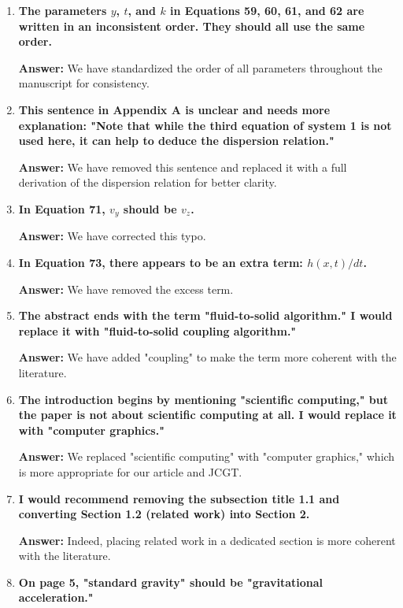 \documentclass{article}
\newcommand{\answer}[1]{\textbf{\textcolor{answercolor}{Answer:}} \textcolor{answercolor}{#1}}
\begin{document}
\begin{enumerate}[label=\textbf{\arabic*.}]
    \answer{We have corrected this case mistake.}

    \item \textbf{The parameters $y$, $t$, and $k$ in Equations 59, 60, 61, and 62 are written in an inconsistent order. They should all use the same order.}
    
    \answer{We have standardized the order of all parameters throughout the manuscript for consistency.}

    \item \textbf{This sentence in Appendix A is unclear and needs more explanation: "Note that while the third equation of system 1 is not used here, it can help to deduce the dispersion relation."}
    
    \answer{We have removed this sentence and replaced it with a full derivation of the dispersion relation for better clarity.}

    \item \textbf{In Equation 71, $v_y$ should be $v_z$.}
    
    \answer{We have corrected this typo.}

    \item \textbf{In Equation 73, there appears to be an extra term: $h(x,t)/dt$.}
    
    \answer{We have removed the excess term.}

    \item \textbf{The abstract ends with the term "fluid-to-solid algorithm." I would replace it with "fluid-to-solid coupling algorithm."}
    
    \answer{We have added "coupling" to make the term more coherent with the literature.}

    \item \textbf{The introduction begins by mentioning "scientific computing," but the paper is not about scientific computing at all. I would replace it with "computer graphics."}
    
    \answer{We replaced "scientific computing" with "computer graphics," which is more appropriate for our article and JCGT.}

    \item \textbf{I would recommend removing the subsection title 1.1 and converting Section 1.2 (related work) into Section 2.}
    
    \answer{Indeed, placing related work in a dedicated section is more coherent with the literature.}

    \item \textbf{On page 5, "standard gravity" should be "gravitational acceleration."}
    

\end{enumerate}
\end{document}
